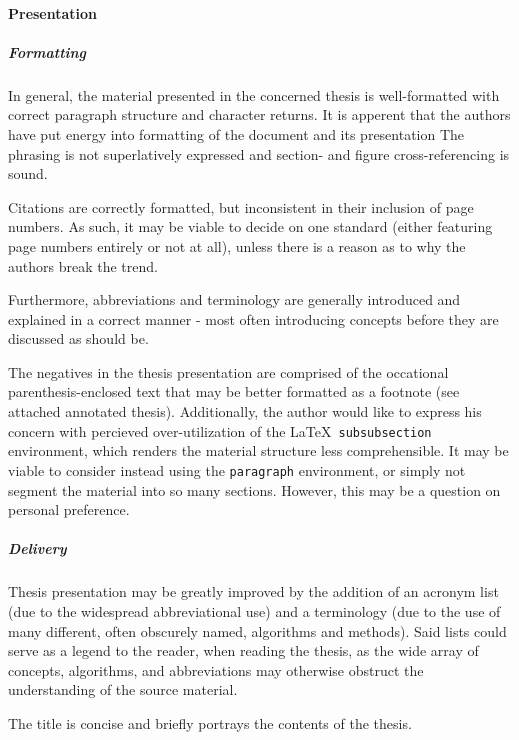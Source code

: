
\paragraph{Presentation}
\label{par:presentation}

\subparagraph{Formatting}
\label{par:formatting}
In general, the material presented in the concerned thesis is well-formatted with correct paragraph structure and character returns.
It is apperent that the authors have put energy into formatting of the document and its presentation
The phrasing is not superlatively expressed and section- and figure cross-referencing is sound.

Citations are correctly formatted, but inconsistent in their inclusion of page numbers.
As such, it may be viable to decide on one standard (either featuring page numbers entirely or not at all), unless there is a reason as to why the authors break the trend.

Furthermore, abbreviations and terminology are generally introduced and explained in a correct manner - most often introducing concepts before they are discussed as should be.

The negatives in the thesis presentation are comprised of the occational parenthesis-enclosed text that may be better formatted as a footnote (see attached annotated thesis).
Additionally, the author would like to express his concern with percieved over-utilization of the \LaTeX\ \texttt{subsubsection} environment, which renders the material structure less comprehensible.
It may be viable to consider instead using the \texttt{paragraph} environment, or simply not segment the material into so many sections.
However, this may be a question on personal preference.

\subparagraph{Delivery}
\label{par:presentation_delivery}
Thesis presentation may be greatly improved by the addition of an acronym list (due to the widespread abbreviational use) and a terminology (due to the use of many different, often obscurely named, algorithms and methods).
Said lists could serve as a legend to the reader, when reading the thesis, as the wide array of concepts, algorithms, and abbreviations may otherwise obstruct the understanding of the source material.

The title is concise and briefly portrays the contents of the thesis.